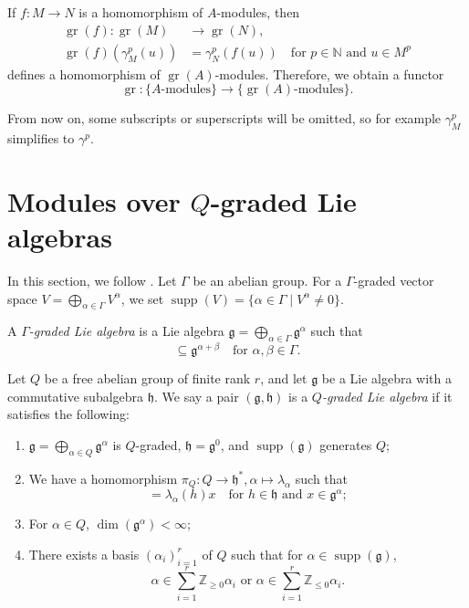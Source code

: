 \documentclass[a4paper, 12pt, reqno]{amsart}
\theoremstyle{remark}
\DeclareMathOperator{\gr}{gr}
\DeclareMathOperator{\supp}{supp}
\begin{document}
If $f: M \to N$ is a homomorphism of $A$-modules, then
\begin{align*}
  \gr(f): \gr(M) &\to \gr(N), \\
  \gr(f)(\gamma_M^p(u)) &= \gamma_N^p(f(u)) \quad \text{for $p \in \mathbb{N}$ and $u \in M^p$}
\end{align*}
defines a homomorphism of $\gr(A)$-modules.
Therefore, we obtain a functor
\begin{equation*}
  \gr: \{\text{$A$-modules}\} \to \{\text{$\gr(A)$-modules}\}.
\end{equation*}

From now on, some subscripts or superscripts will be omitted, so for example $\gamma^p_M$ simplifies to $\gamma^p$.

\section{Modules over $Q$-graded Lie algebras}
\label{sec:modules-over-q}

In this section, we follow \cite[\S2]{iohara_representation_2011}.
Let $\Gamma$ be an abelian group.
For a $\Gamma$-graded vector space $V = \bigoplus_{\alpha \in \Gamma}V^{\alpha}$, we set $\supp(V) = \{\alpha \in \Gamma \mid V^{\alpha} \neq 0\}$.

A \emph{$\Gamma$-graded Lie algebra} is a Lie algebra $\mathfrak{g} = \bigoplus_{\alpha \in \Gamma}\mathfrak{g}^{\alpha}$ such that
\begin{equation*}
  [\mathfrak{g}^{\alpha}, \mathfrak{g}^{\beta}] \subseteq \mathfrak{g}^{\alpha + \beta} \quad \text{for $\alpha, \beta \in \Gamma$}.
\end{equation*}

Let $Q$ be a free abelian group of finite rank $r$, and let $\mathfrak{g}$ be a Lie algebra with a commutative subalgebra $\mathfrak{h}$.
We say a pair $(\mathfrak{g}, \mathfrak{h})$ is a \emph{$Q$-graded Lie algebra} if it satisfies the following:
\begin{enumerate}
\item $\mathfrak{g} = \bigoplus_{\alpha \in Q}\mathfrak{g}^{\alpha}$ is $Q$-graded, $\mathfrak{h} = \mathfrak{g}^0$, and $\supp(\mathfrak{g})$ generates $Q$;
\item We have a homomorphism $\pi_Q: Q \to \mathfrak{h}^*, \alpha \mapsto \lambda_{\alpha}$ such that
  \begin{equation*}
    [h, x] = \lambda_{\alpha}(h)x \quad \text{for $h \in \mathfrak{h}$ and $x \in \mathfrak{g}^{\alpha}$};
  \end{equation*}
\item For $\alpha \in Q$, $\dim(\mathfrak{g}^{\alpha}) < \infty$;
\item There exists a basis $(\alpha_i)_{i = 1}^r$ of $Q$ such that for $\alpha \in \supp(\mathfrak{g})$,
  \begin{equation*}
    \text{$\alpha \in \sum_{i = 1}^r\mathbb{Z}_{\ge 0}\alpha_i$ or $\alpha \in \sum_{i = 1}^r\mathbb{Z}_{\le 0}\alpha_i$}.
  \end{equation*}
\end{enumerate}
\end{document}

